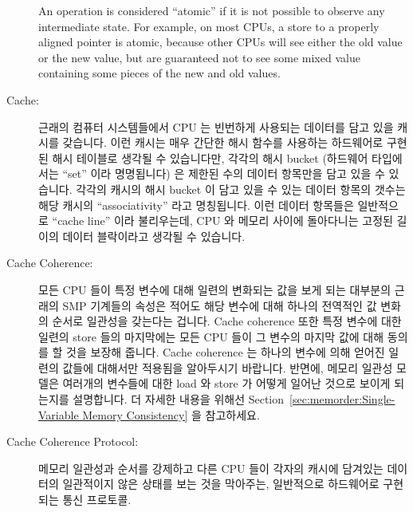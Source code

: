 \begin{description}
	An operation is considered ``atomic'' if it is not possible to
	observe any intermediate state.
	For example, on most CPUs, a store to a properly aligned pointer
	is atomic, because other CPUs will see either the old value or
	the new value, but are guaranteed not to see some mixed value
	containing some pieces of the new and old values.
	\fi
\item[Cache:]
	근래의 컴퓨터 시스템들에서 CPU 는 빈번하게 사용되는 데이터를 담고 있을
	캐시를 갖습니다.
	이런 캐시는 매우 간단한 해시 함수를 사용하는 하드웨어로 구현된 해시
	테이블로 생각될 수 있습니다만, 각각의 해시 bucket (하드웨어 타입에서는
	``set'' 이라 명명됩니다) 은 제한된 수의 데이터 항목만을 담고 있을 수
	있습니다.
	각각의 캐시의 해시 bucket 이 담고 있을 수 있는 데이터 항목의 갯수는
	해당 캐시의 ``associativity'' 라고 명칭됩니다.
	이런 데이터 항목들은 일반적으로 ``cache line'' 이라 불리우는데, CPU 와
	메모리 사이에 돌아다니는 고정된 길이의 데이터 블락이라고 생각될 수
	있습니다.
	\iffalse

	In modern computer systems, CPUs have caches in which to hold
	frequently used data.
	These caches can be thought of as hardware hash tables with very
	simple hash functions,
	but in which each hash bucket (termed a ``set'' by hardware types)
	can hold only a limited number of data items.
	The number of data items that can be held by each of a cache's hash
	buckets is termed the cache's ``associativity''.
	These data items are normally called ``cache lines'', which
	can be thought of a fixed-length blocks of data that circulate
	among the CPUs and memory.
	\fi
\item[Cache Coherence:]
	모든 CPU 들이 특정 변수에 대해 일련의 변화되는 값을 보게 되는 대부분의
	근래의 SMP 기계들의 속성은 적어도 해당 변수에 대해 하나의 전역적인 값
	변화의 순서로 일관성을 갖는다는 겁니다.
	Cache coherence 또한 특정 변수에 대한 일련의 store 들의 마지막에는 모든
	CPU 들이 그 변수의 마지막 값에 대해 동의를 할 것을 보장해 줍니다.
	Cache coherence 는 하나의 변수에 의해 얻어진 일련의 값들에 대해서만
	적용됨을 알아두시기 바랍니다.
	반면에, 메모리 일관성 모델은 여러개의 변수들에 대한 load 와 store 가
	어떻게 일어난 것으로 보이게 되는지를 설명합니다.
	더 자세한 내용을 위해선
	Section~\ref{sec:memorder:Single-Variable Memory Consistency} 을
	참고하세요.
	\iffalse

	A property of most modern SMP machines where all CPUs will
	observe a sequence of values for a given variable that is
	consistent with at least one global order of values for
	that variable.
	Cache coherence also guarantees that at the end of a group
	of stores to a given variable, all CPUs will agree
	on the final value for that variable.
	Note that cache coherence applies only to the series of values
	taken on by a single variable.
	In contrast, the memory consistency model for a given machine
	describes the order in which loads and stores to groups of
	variables will appear to occur.
	See Section~\ref{sec:memorder:Single-Variable Memory Consistency}
	for more information.
	\fi
\item[Cache Coherence Protocol:]
	메모리 일관성과 순서를 강제하고 다른 CPU 들이 각자의 캐시에 담겨있는
	데이터의 일관적이지 않은 상태를 보는 것을 막아주는, 일반적으로
	하드웨어로 구현되는 통신 프로토콜.
	\iffalse


\end{description}
